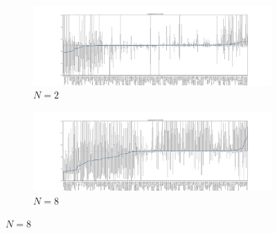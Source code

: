 \documentclass{article}
\begin{document}
\begin{figure}[!hbtp]
    \centering
    \begin{subfigure}[t]{\textwidth}
        \centering
        \includegraphics[width=\textwidth]{../img/coexistance_boxplot_2_std.pdf}
        \caption{\(N=2\)}
    \end{subfigure}%



    \begin{subfigure}[htbp]{\textwidth}
        \centering
        \includegraphics[width=\textwidth]{../img/coexistance_boxplot_8_std.pdf}
        \caption{\(N=8\)}
    \end{subfigure}%




\end{figure}
\end{document}
